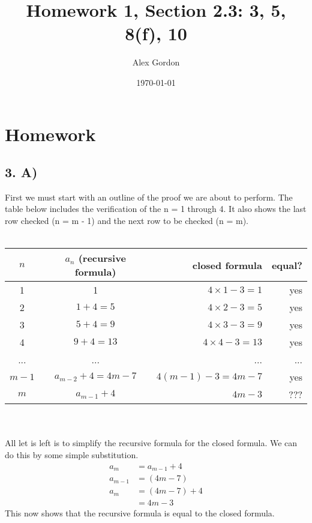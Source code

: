 \documentclass[12]{scrartcl}
\begin{document}
\title{Homework 1, Section 2.3: 3, 5, 8(f), 10 }
\author{Alex Gordon}
\date{\today}
\maketitle
\section*{Homework}
\subsection*{3. A)}
First we must start with an outline of the proof we are about to perform. The table below includes the verification of the n = 1 through 4. It also shows the last row checked (n = m - 1) and the next row to be checked (n = m). \\ \\
\begin{tabular}{ | c | c | r | r |  }
  \hline
 $n$ & $a_n$ (recursive formula) & closed formula & equal?  \\
  \hline
  1 & 1 & $4 \times 1 - 3 = 1 $ & yes \\     \hline
  2 & $ 1 + 4 = 5$ & $4 \times 2 - 3 = 5$ & yes \\     \hline
  3 & $ 5 + 4 = 9$ & $4 \times 3 - 3 = 9$ & yes \\     \hline
  4 & $ 9 + 4 = 13$ & $4 \times 4 - 3 = 13$ & yes \\      \hline
  ... & ... & ... & ... \\   \hline
 $m - 1$ & $a_{m-2} + 4 = 4m - 7$ & $4(m - 1) - 3 = 4m - 7$ & yes \\   \hline \hline
  $m$ & $a_{m-1} + 4$& $4m - 3$ & ??? \\                  
  \hline  
\end{tabular}
\\
\\All let is left is to simplify the recursive formula for the closed formula. We can do this by some simple substitution. 
\begin{align*} 
a_m &= a_{m-1} + 4
\\ a_{m-1} &= (4m - 7)
\\ a_m &= (4m - 7) + 4
\\ &= 4m - 3
\end{align*}
This now shows that the recursive formula is equal to the closed formula. 
\end{document}

